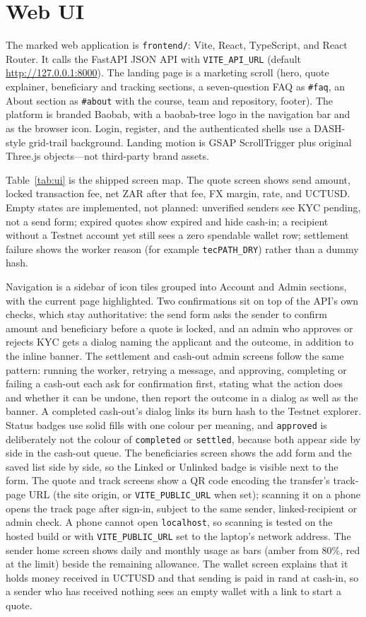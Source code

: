 \documentclass[11pt]{article}
\begin{document}
\newpage
\section{Web UI}
\label{sec:ui}
The marked web application is \texttt{frontend/}: Vite, React, TypeScript, and React Router. It calls the FastAPI JSON API with \texttt{VITE\_API\_URL} (default \url{http://127.0.0.1:8000}). The landing page is a marketing scroll (hero, quote explainer, beneficiary and tracking sections, a seven-question FAQ as \texttt{\#faq}, an About section as \texttt{\#about} with the course, team and repository, footer). The platform is branded Baobab, with a baobab-tree logo in the navigation bar and as the browser icon. Login, register, and the authenticated shells use a DASH-style grid-trail background. Landing motion is GSAP ScrollTrigger plus original Three.js objects---not third-party brand assets.

Table~\ref{tab:ui} is the shipped screen map. The quote screen shows send amount, locked transaction fee, net ZAR after that fee, FX margin, rate, and UCTUSD. Empty states are implemented, not planned: unverified senders see KYC pending, not a send form; expired quotes show expired and hide cash-in; a recipient without a Testnet account yet still sees a zero spendable wallet row; settlement failure shows the worker reason (for example \texttt{tecPATH\_DRY}) rather than a dummy hash.

Navigation is a sidebar of icon tiles grouped into Account and Admin sections, with the current page highlighted. Two confirmations sit on top of the API's own checks, which stay authoritative: the send form asks the sender to confirm amount and beneficiary before a quote is locked, and an admin who approves or rejects KYC gets a dialog naming the applicant and the outcome, in addition to the inline banner. The settlement and cash-out admin screens follow the same pattern: running the worker, retrying a message, and approving, completing or failing a cash-out each ask for confirmation first, stating what the action does and whether it can be undone, then report the outcome in a dialog as well as the banner. A completed cash-out's dialog links its burn hash to the Testnet explorer. Status badges use solid fills with one colour per meaning, and \texttt{approved} is deliberately not the colour of \texttt{completed} or \texttt{settled}, because both appear side by side in the cash-out queue. The beneficiaries screen shows the add form and the saved list side by side, so the Linked or Unlinked badge is visible next to the form. The quote and track screens show a QR code encoding the transfer's track-page URL (the site origin, or \texttt{VITE\_PUBLIC\_URL} when set); scanning it on a phone opens the track page after sign-in, subject to the same sender, linked-recipient or admin check. A phone cannot open \texttt{localhost}, so scanning is tested on the hosted build or with \texttt{VITE\_PUBLIC\_URL} set to the laptop's network address. The sender home screen shows daily and monthly usage as bars (amber from 80\%, red at the limit) beside the remaining allowance. The wallet screen explains that it holds money received in UCTUSD and that sending is paid in rand at cash-in, so a sender who has received nothing sees an empty wallet with a link to start a quote.
\end{document}
